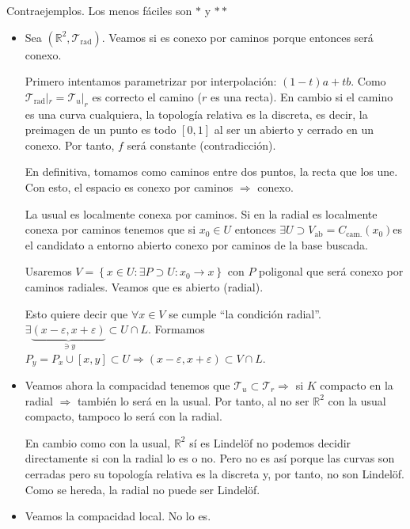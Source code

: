 \begin{enun}
Contraejemplos. Los menos fáciles son $*$ y $**$ 
\end{enun}

\begin{ej}
\begin{itemize}
    \item Sea $\left( \mathbb{R}^2, \mathcal{T}_{\text{rad}} \right)$. Veamos si es conexo por caminos porque entonces será conexo.

    Primero intentamos parametrizar por interpolación: $\left( 1 - t \right)a + tb$. Como $\mathcal{T}_{\text{rad}}|_r = \mathcal{T}_{u}|_r$ es correcto el camino ($r$ es una recta).
    En cambio si el camino es una curva cualquiera, la topología relativa es la discreta, es decir, la preimagen de un punto es todo $\left[ 0, 1 \right]$ al ser 
    un abierto y cerrado en un conexo. Por tanto, $f$ será constante (contradicción).

    En definitiva, tomamos como caminos entre dos puntos, la recta que los une. Con esto, el espacio es conexo por caminos $\Rightarrow$ conexo.

    La usual es localmente conexa por caminos. Si en la radial es localmente conexa por caminos tenemos que si $x_0 \in U$ entonces $\exists U \supset V_{\text{ab}} = C_{\text{cam.}} \left( x_0 \right)$es el candidato a entorno abierto conexo por caminos de la base buscada. 

    Usaremos $V = \left\{ x \in U : \exists P \supset U: x_0 \rightarrow x\right\}$ con $P$ poligonal %
    que será conexo por caminos radiales. Veamos que es abierto (radial).

    Esto quiere decir que $\forall x \in V$ se cumple ``la condición radial''.
    $\exists \underbrace{\left( x - \varepsilon, x + \varepsilon \right)}_{\ni y} \subset U \cap L$. Formamos $P_y = P_x \cup \left[ x, y \right] \subset U \Rightarrow \left( x - \varepsilon, x + \varepsilon \right) \subset V \cap L$.

    \item Veamos ahora la compacidad tenemos que $\mathcal{T}_u \subset \mathcal{T}_r \Rightarrow$ si $K$ compacto en la radial $\Rightarrow$ también lo será en la usual. Por tanto, al no ser $\mathbb{R}^2$ con la usual compacto, tampoco lo será con la radial.

    En cambio como con la usual, $\mathbb{R}^2$ sí es Lindelöf no podemos decidir directamente si con la radial lo es o no. Pero no es así porque las curvas son cerradas pero su topología relativa es la 
    discreta y, por tanto, no son Lindelöf. Como se hereda, la radial no puede ser Lindelöf.

    \item Veamos la compacidad local. No lo es. %
\end{itemize}
\end{ej}
